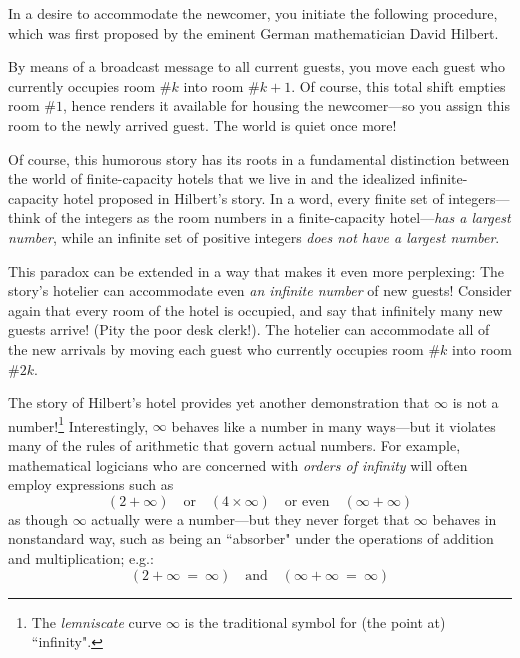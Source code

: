 In a desire to accommodate the newcomer, you initiate the following procedure, which was first proposed by the eminent German mathematician David Hilbert. 

\smallskip

By means of a broadcast message to all current guests, you move each guest who currently occupies room \#$k$ into room \#$k+1$.  Of course, this total shift empties room \#$1$, hence renders it available for housing the newcomer---so you assign this room to the newly arrived guest.  The world is quiet once more!

\smallskip

Of course, this humorous story has its roots in a fundamental distinction between the world of finite-capacity hotels that we live in and the idealized infinite-capacity hotel proposed in Hilbert's story.  In a word, every finite set of integers---think of the integers as the room numbers in a finite-capacity hotel---{\em has a largest number}, while an infinite set of positive integers {\em does not have a largest number}.

\medskip
  
This paradox can be extended in a way that makes it even more  perplexing:  The story's hotelier can accommodate even {\em an infinite number} of new guests!  Consider again that every room 
of the hotel is occupied, and say that infinitely many new guests arrive!  (Pity the poor desk clerk!). The hotelier can accommodate all of the new arrivals by moving each guest who currently occupies room \#$k$ into room \#$2k$.

\medskip

The story of Hilbert's hotel provides yet another demonstration that $\infty$ is not a number!\footnote{The \textit{lemniscate} curve $\infty$ is the traditional symbol for (the point at) ``infinity".} Interestingly, $\infty$ behaves like a number in many ways---but it violates many of the rules of arithmetic that govern actual numbers.  For example, mathematical logicians who are concerned with {\em orders of infinity} will often employ expressions such as
\[ (2 + \infty)  \ \ \  \mbox{ or } \ \ \ (4 \times \infty) \ \ \
\mbox{ or even } \ \ \ (\infty + \infty) \]
as though $\infty$ actually were a number---but they never forget that $\infty$ behaves in nonstandard way, such as being an ``absorber" under the operations of addition and multiplication; e.g.:
\[ (2 + \infty \ = \ \infty)  \ \ \  \mbox{ and } \ \ \  (\infty + \infty \ = \ \infty) \]

